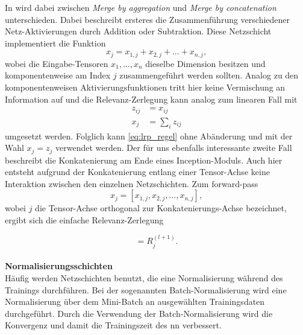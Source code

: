 \documentclass[twoside, 12pt,a4paper]{book}
\numberwithin{equation}{section}
\begin{document}
	\noindent In \cite{lapuschkin} wird dabei zwischen \textit{Merge by aggregation} und \textit{Merge by concatenation} unterschieden. Dabei beschreibt ersteres die Zusammenführung verschiedener Netz-Aktivierungen durch Addition oder Subtraktion. Diese Netzschicht implementiert die Funktion
	\begin{equation}
		x_j = x_{1,j} + x_{2,j} + ... + x_{n,j},
	\end{equation}
	wobei die Eingabe-Tensoren $x_1, ..., x_n$ dieselbe Dimension besitzen und kom\-po\-nen\-ten\-wei\-se am Index $j$ zusammengeführt werden sollten. Analog zu den komponentenweisen Aktivierungsfunktionen tritt hier keine Vermischung an Information auf und die Relevanz-Zerlegung kann analog zum linearen Fall mit 
	\begin{align}
		z_{ij} &= x_{ij}\\
		x_j &= \sum_i{z_{ij}}
	\end{align} umgesetzt werden. Folglich kann \eqref{eq:lrp_regel} ohne Abänderung und mit der Wahl $x_j= z_j$ verwendet werden. Der für uns ebenfalls interessante zweite Fall beschreibt die Konkatenierung am Ende eines Inception-Moduls. Auch hier entsteht aufgrund der Konkatenierung entlang einer Tensor-Achse keine Interaktion zwischen den einzelnen Netzschichten. Zum forward-pass
	\begin{equation}
		x_j = [x_{1,j}, x_{2,j}, ... , x_{n,j}],
	\end{equation}
	wobei $j$ die Tensor-Achse orthogonal zur Konkatenierungs-Achse bezeichnet, ergibt sich die einfache Relevanz-Zerlegung
	
	\begin{equation}
		[R_{1,j}^{(l)}, R_{2,j}^{(l)}, ..., R_{n,j}^{(l)}] = R_j^{(l+1)}.
	\end{equation}\\
	
	\noindent\textbf{Normalisierungsschichten}\\
	Häufig werden Netzschichten benutzt, die eine Normalisierung während des Trainings durchführen. Bei der sogenannten Batch-Normalisierung wird eine Normalisierung über dem Mini-Batch an ausgewählten Trainingsdaten durchgeführt. Durch die Verwendung der Batch-Normalisierung wird die Konvergenz und damit die Trainingszeit des \ac{nn} verbessert.\\
	
\end{document}
